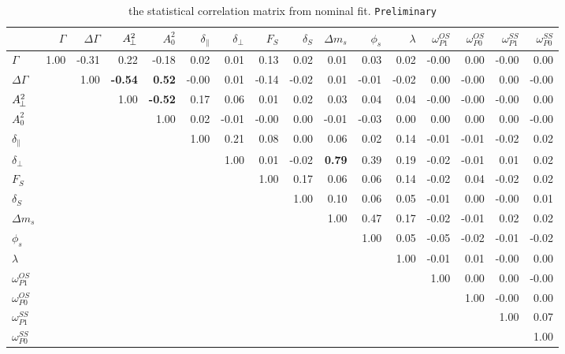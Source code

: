 \begin{sidewaystable}[htb]
  \caption{
   the statistical correlation matrix from nominal fit. {\tt Preliminary}
}
    \small{
\begin{center}\begin{tabular}{@{}|l|r|r|r|r|r|r|r|r|r|r|r|r|r|r|r|@{}}
\hline
& $\Gamma$ & $\Delta\Gamma$ & $A_{\hspace{-1pt}\perp}^{2}$ & $A_0^2$ & $\delta_\parallel$ & $\delta_\perp$ & $F_S$ & $\delta_S$ & $\Delta m_s$ & $\phi_s$ & $\lambda$ & $\omega_{P1}^{OS}$ & $\omega_{P0}^{OS}$ & $\omega_{P1}^{SS}$ & $\omega_{P0}^{SS}$\\ \hline \hline
$\Gamma$ & 1.00 & -0.31 & 0.22 & -0.18 & 0.02 & 0.01 & 0.13 & 0.02 & 0.01 & 0.03 & 0.02 & -0.00 & 0.00 & -0.00 & 0.00 \\
$\Delta\Gamma$ &  & 1.00 & \bf{-0.54} & \bf{0.52} & -0.00 & 0.01 & -0.14 & -0.02 & 0.01 & -0.01 & -0.02 & 0.00 & -0.00 & 0.00 & -0.00 \\
$A_{\hspace{-1pt}\perp}^{2}$ &  &  & 1.00 & \bf{-0.52} & 0.17 & 0.06 & 0.01 & 0.02 & 0.03 & 0.04 & 0.04 & -0.00 & -0.00 & -0.00 & 0.00 \\
$A_0^2$ &  &  &  & 1.00 & 0.02 & -0.01 & -0.00 & 0.00 & -0.01 & -0.03 & 0.00 & 0.00 & 0.00 & 0.00 & -0.00 \\
$\delta_\parallel$ &  &  &  &  & 1.00 & 0.21 & 0.08 & 0.00 & 0.06 & 0.02 & 0.14 & -0.01 & -0.01 & -0.02 & 0.02 \\
$\delta_\perp$ &  &  &  &  &  & 1.00 & 0.01 & -0.02 & \bf{0.79} & 0.39 & 0.19 & -0.02 & -0.01 & 0.01 & 0.02 \\
$F_S$ &  &  &  &  &  &  & 1.00 & 0.17 & 0.06 & 0.06 & 0.14 & -0.02 & 0.04 & -0.02 & 0.02 \\
$\delta_S$ &  &  &  &  &  &  &  & 1.00 & 0.10 & 0.06 & 0.05 & -0.01 & 0.00 & -0.00 & 0.01 \\
$\Delta m_s$ &  &  &  &  &  &  &  &  & 1.00 & 0.47 & 0.17 & -0.02 & -0.01 & 0.02 & 0.02 \\
$\phi_s$ &  &  &  &  &  &  &  &  &  & 1.00 & 0.05 & -0.05 & -0.02 & -0.01 & -0.02 \\
$\lambda$ &  &  &  &  &  &  &  &  &  &  & 1.00 & -0.01 & 0.01 & -0.00 & 0.00 \\
$\omega_{P1}^{OS}$ &  &  &  &  &  &  &  &  &  &  &  & 1.00 & 0.00 & 0.00 & -0.00 \\
$\omega_{P0}^{OS}$ &  &  &  &  &  &  &  &  &  &  &  &  & 1.00 & -0.00 & 0.00 \\
$\omega_{P1}^{SS}$ &  &  &  &  &  &  &  &  &  &  &  &  &  & 1.00 & 0.07 \\
$\omega_{P0}^{SS}$ &  &  &  &  &  &  &  &  &  &  &  &  &  &  & 1.00 \\
\hline
\end{tabular}\end{center}
  }
\label{tab:CorrelationMatrix}
\end{sidewaystable}

